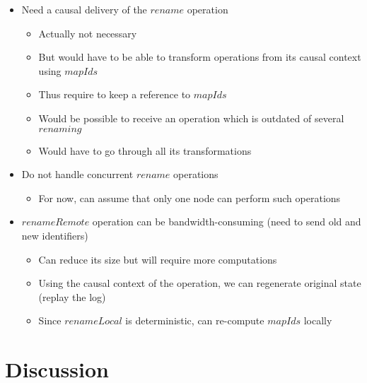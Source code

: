 \documentclass[a4paper]{article}
\begin{document}
\begin{itemize}
  \item Need a causal delivery of the $rename$ operation
  \begin{itemize}
    \item Actually not necessary
    \item But would have to be able to transform operations from its causal context using $mapIds$
    \item Thus require to keep a reference to $mapIds$
    \item Would be possible to receive an operation which is outdated of several $renaming$
    \item Would have to go through all its transformations
  \end{itemize}
  \item Do not handle concurrent $rename$ operations
  \begin{itemize}
    \item For now, can assume that only one node can perform such operations
  \end{itemize}
  \item $renameRemote$ operation can be bandwidth-consuming (need to send old and new identifiers)
  \begin{itemize}
    \item Can reduce its size but will require more computations
    \item Using the causal context of the operation, we can regenerate original state (replay the log)
    \item Since $renameLocal$ is deterministic, can re-compute $mapIds$ locally
  \end{itemize}
\end{itemize}

\section{Discussion}
\end{document}

